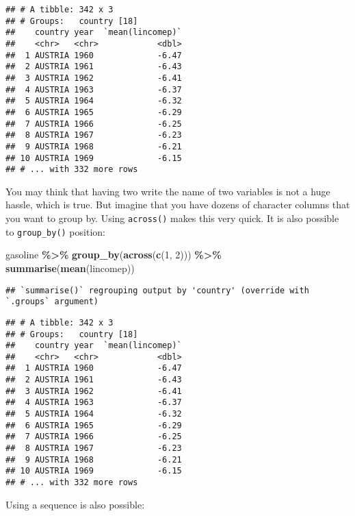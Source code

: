\documentclass[
]{article}
\newenvironment{Shaded}{\begin{snugshade}}{\end{snugshade}}
\newcommand{\DecValTok}[1]{\textcolor[rgb]{0.00,0.00,0.81}{#1}}
\newcommand{\KeywordTok}[1]{\textcolor[rgb]{0.13,0.29,0.53}{\textbf{#1}}}
\newcommand{\NormalTok}[1]{#1}
\newcommand{\OperatorTok}[1]{\textcolor[rgb]{0.81,0.36,0.00}{\textbf{#1}}}
\newcommand{\StringTok}[1]{\textcolor[rgb]{0.31,0.60,0.02}{#1}}
\begin{document}
\begin{verbatim}
## # A tibble: 342 x 3
## # Groups:   country [18]
##    country year  `mean(lincomep)`
##    <chr>   <chr>            <dbl>
##  1 AUSTRIA 1960             -6.47
##  2 AUSTRIA 1961             -6.43
##  3 AUSTRIA 1962             -6.41
##  4 AUSTRIA 1963             -6.37
##  5 AUSTRIA 1964             -6.32
##  6 AUSTRIA 1965             -6.29
##  7 AUSTRIA 1966             -6.25
##  8 AUSTRIA 1967             -6.23
##  9 AUSTRIA 1968             -6.21
## 10 AUSTRIA 1969             -6.15
## # ... with 332 more rows
\end{verbatim}

You may think that having two write the name of two variables is not a huge hassle, which is true.
But imagine that you have dozens of character columns that you want to group by. Using \texttt{across()}
makes this very quick. It is also possible to \texttt{group\_by()} position:

\begin{Shaded}
\begin{Highlighting}[]
\NormalTok{gasoline }\OperatorTok{\%\textgreater{}\%}
\StringTok{    }\KeywordTok{group\_by}\NormalTok{(}\KeywordTok{across}\NormalTok{(}\KeywordTok{c}\NormalTok{(}\DecValTok{1}\NormalTok{, }\DecValTok{2}\NormalTok{))) }\OperatorTok{\%\textgreater{}\%}
\StringTok{    }\KeywordTok{summarise}\NormalTok{(}\KeywordTok{mean}\NormalTok{(lincomep))}
\end{Highlighting}
\end{Shaded}

\begin{verbatim}
## `summarise()` regrouping output by 'country' (override with `.groups` argument)
\end{verbatim}

\begin{verbatim}
## # A tibble: 342 x 3
## # Groups:   country [18]
##    country year  `mean(lincomep)`
##    <chr>   <chr>            <dbl>
##  1 AUSTRIA 1960             -6.47
##  2 AUSTRIA 1961             -6.43
##  3 AUSTRIA 1962             -6.41
##  4 AUSTRIA 1963             -6.37
##  5 AUSTRIA 1964             -6.32
##  6 AUSTRIA 1965             -6.29
##  7 AUSTRIA 1966             -6.25
##  8 AUSTRIA 1967             -6.23
##  9 AUSTRIA 1968             -6.21
## 10 AUSTRIA 1969             -6.15
## # ... with 332 more rows
\end{verbatim}

Using a sequence is also possible:
\end{document}

